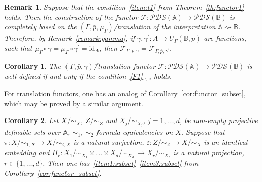 \documentclass[12pt]{article}
\newtheorem{corollary}{Corollary}
\newtheorem{remark}{Remark}
\theoremstyle{definition}
\def\MA{{\mathbb{A}}}
\def\MB{{\mathbb{B}}}
\newcommand{\nsA}{\widetilde{\mathbb A}}
\def\F{{\mathcal{F}}}
\def\PDS{{\mathcal{PDS}}}
\def\id{{\mathrm{id}}}
\begin{document}
\begin{remark}\label{remark:gamma_tr}
Suppose that the condition~\ref{item:t1} from Theorem~\ref{th:functor1} holds. Then  the construction of the functor $\F\colon \PDS(\MA)\to \PDS(\MB)$ is completely based on the $(\Gamma,\bar p,\mu_\Gamma)$\=/translation of the interpretation $\nsA\rightsquigarrow\MB$. Therefore, by Remark~\ref{remark:gamma}, if $\gamma,\gamma^\prime\colon A\to U_\Gamma(\MB,\bar p)$ are functions, such that $\mu_\Gamma\circ\gamma=\mu_\Gamma\circ\gamma^\prime=\id_A$, then $\F_{\Gamma,\bar p,\gamma}=\F_{\Gamma,\bar p,\gamma^\prime}$. 
\end{remark}

\begin{corollary}\label{cor:inj1}
The $(\Gamma,\bar p,\gamma)$\=/translation functor $\F\colon \PDS(\MA)\to \PDS(\MB)$ is well-defined if and only if the condition~\ref{F1}$_{\omega,\omega}$ holds.
\end{corollary}

For translation functors, one has an analog of Corollary~\ref{cor:functor_subset}, which may be proved by a similar argument.

\begin{corollary}\label{cor:tr_functor_subset}
Let $X/{\sim_{X}}$, $Z/{\sim_Z}$ and $X_j/{\sim_{X_j}}$, $j=1,\ldots,d$, be non-empty projective definable sets over $\MA$, $\sim_{1}$, $\sim_{2}$ formula equivalencies on $X$. Suppose that $\pi\colon X/{\sim_{1,X}}\to X/{\sim_{2,X}}$ is a natural surjection, $\varepsilon\colon Z/{\sim_Z}\to X/{\sim_X}$ is an identical embedding and $\Pi_r\colon X_1/{\sim_{X_1}}\times\ldots\times X_d/{\sim_{X_d}}\,\to X_r/{\sim_{X_r}}$ is a natural projection, $r\in\{1,\ldots,d\}$. Then one has~\ref{item1:subset}--\ref{item3:subset} from Corollary~\ref{cor:functor_subset}.  
\end{corollary}
 
\end{document}
